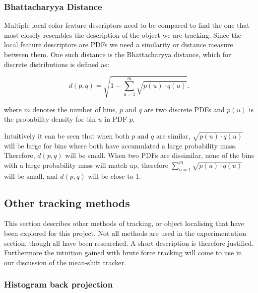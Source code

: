 \documentclass[a4paper,11pt]{article}
\begin{document}
\subsubsection{Bhattacharyya Distance}

Multiple local color feature descriptors need to be compared to find the one that most closely resembles the description of the object we are tracking. Since the local feature descriptors are PDFs we need a similarity or distance measure between them. One such distance is the Bhattacharyya distance, which for discrete distributions is defined as:



\begin{equation}
\label{eq:bhattdistance}
d(p,q) = \sqrt{1-\sum_{u=1}^{m} \sqrt{p(u)\cdot q(u)}}.
\end{equation}

where $m$ denotes the number of bins, $p$ and $q$ are two discrete PDFs and $p(u)$ is the probability density for bin $u$ in PDF $p$. 



Intuitively it can be seen that when both $p$ and $q$ are similar, $\sqrt{p(u)\cdot q(u)}$ will be large for bins where both have accumulated a large probability mass. Therefore, $d(p,q)$ will be small. When two PDFs are dissimilar, none of the bins with a large probability mass will match up, therefore  $\sum_{u=1}^{m} \sqrt{p(u)\cdot q(u)}$ will be small, and $d(p,q)$ will be close to 1.






\subsection{Other tracking methods}

This section describes other methods of tracking, or object localising that have been explored for this project. Not all methods are used in the experimentation section, though all have been researched. A short description is therefore justified. Furthermore the intuition gained with brute force tracking will come to use in our discussion of the mean-shift tracker.



\subsubsection{Histogram back projection}
\end{document}
